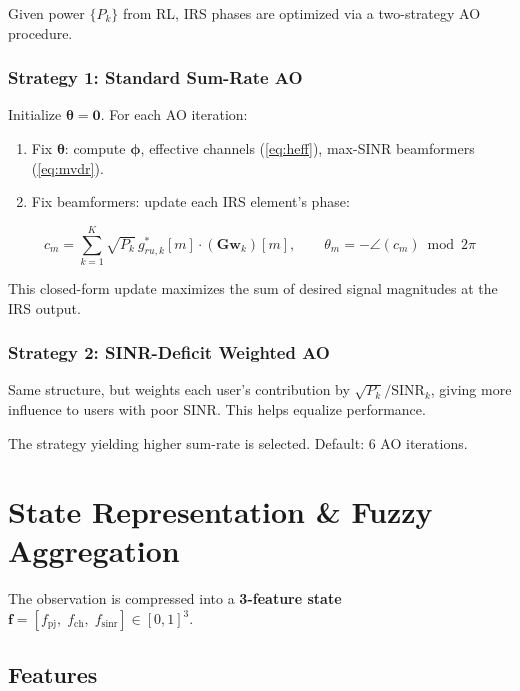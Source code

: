 \documentclass[11pt,a4paper]{article}
\begin{document}
Given power $\{P_k\}$ from RL, IRS phases are optimized via a two-strategy AO procedure.

\subsubsection{Strategy 1: Standard Sum-Rate AO}

Initialize $\boldsymbol{\theta} = \mathbf{0}$. For each AO iteration:
\begin{enumerate}[nosep]
    \item Fix $\boldsymbol{\theta}$: compute $\boldsymbol{\phi}$, effective channels (\ref{eq:heff}), max-SINR beamformers (\ref{eq:mvdr}).
    \item Fix beamformers: update each IRS element's phase:
\end{enumerate}
\begin{equation}
c_m = \sum_{k=1}^{K} \sqrt{P_k}\, g_{ru,k}^*[m] \cdot \left(\mathbf{G} \mathbf{w}_k\right)[m], \qquad \theta_m = -\angle(c_m) \bmod 2\pi
\end{equation}

This closed-form update maximizes the sum of desired signal magnitudes at the IRS output.

\subsubsection{Strategy 2: SINR-Deficit Weighted AO}

Same structure, but weights each user's contribution by $\sqrt{P_k}/\mathrm{SINR}_k$, giving more influence to users with poor SINR. This helps equalize performance.

The strategy yielding higher sum-rate is selected. Default: 6 AO iterations.


\section{State Representation \& Fuzzy Aggregation}

The observation is compressed into a \textbf{3-feature state} $\mathbf{f} = [f_{\mathrm{pj}},\; f_{\mathrm{ch}},\; f_{\mathrm{sinr}}] \in [0,1]^3$.

\subsection{Features}
\end{document}
